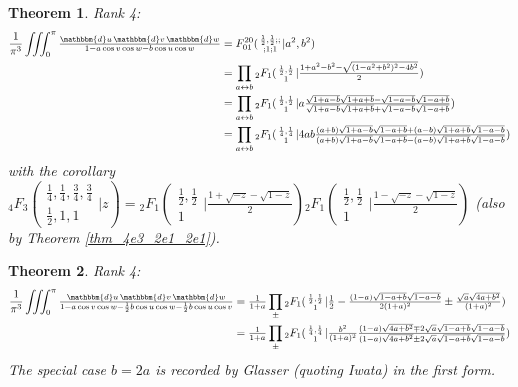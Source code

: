 \documentclass[12pt]{article}
\newcommand{\dd}[0] {\mathbbm{d}}
\numberwithin{equation}{section}
\newtheorem{theorem}{Theorem}[section]
\newcommand{\Head}[3] {{}_{#1}{#2}_{#3}}
\newcommand{\ArgS}[3] {( \begin{smallmatrix} #1 \\ #2 \end{smallmatrix} | {#3})}
\newcommand{\ArgKS}[1] {\ArgS{\frac12,\frac12}{1}{#1}}
\newcommand{\TwoHead}[3] {{#1}_{#3}^{#2}}
\newcommand{\HypFfourS}[6] {\TwoHead{F}{2 0}{0 1} \ArgS{{#1},{#2};;}{;{#3};{#4}}{{#5},{#6}}}
\newcommand{\FFs}[6] {{}_{#1}{#2}_{#3} ( \begin{smallmatrix} #4 \\ #5 \end{smallmatrix} | {#6}  )}
\begin{document}
\begin{theorem} Rank 4:
\begin{align*}
\frac{1}{\pi^3} \iiint_0^{\pi} \tfrac{\dd u \, \dd v \, \dd w} {1 - a \cos v \cos w - b \cos u \cos w} &= \HypFfourS{\frac12}{\frac12}{1}{1}{a^2}{b^2}\\
 &= \prod_{a \leftrightarrow b} \Head{2}{F}{1} \ArgKS{\tfrac{1 + a^2 - b^2-\sqrt{(1-a^2+b^2)^2-4b^2}}{2}}\\
&= \prod_{a \leftrightarrow b} \Head{2}{F}{1} \ArgKS{a\tfrac{\sqrt{1+a-b}\sqrt{1+a+b}-\sqrt{1-a-b}\sqrt{1-a+b}}{\sqrt{1+a-b}\sqrt{1+a+b}+\sqrt{1-a-b}\sqrt{1-a+b}}}\\
&= \prod_{a \leftrightarrow b} \Head{2}{F}{1}\ArgS{\frac14,\frac14}{1}{4a b \tfrac{(a+b)\sqrt{1+a-b}\sqrt{1-a+b} + (a-b) \sqrt{1+a+b}\sqrt{1-a-b}}{(a+b)\sqrt{1+a-b}\sqrt{1-a+b} - (a-b) \sqrt{1+a+b}\sqrt{1-a-b}}}
\end{align*}
with the corollary
$\FFs{4}{F}{3}{\frac14,\frac14,\frac34,\frac34}{\frac12,1,1}{z} = \Head{2}{F}{1}\ArgKS{\tfrac{1+\sqrt{-z} -\sqrt{1-z}}{2}} \Head{2}{F}{1}\ArgKS{\tfrac{1-\sqrt{-z} -\sqrt{1-z}}{2}}$ (also by Theorem \ref{thm_4e3_2e1_2e1}).
\end{theorem}

\begin{theorem} Rank 4:
\begin{align*}
\frac{1}{\pi^3} \iiint_0^{\pi} \tfrac{\dd u \, \dd v \, \dd w} {1 - a \cos v \cos w - \frac12 b \cos u \cos w - \frac12 b \cos u \cos v} &= \tfrac{1}{1+a} \prod_{\pm} \Head{2}{F}{1} \ArgKS{\tfrac{1}{2}-\tfrac{(1-a)\sqrt{1-a+b}\sqrt{1-a-b}}{2(1+a)^2} \pm \tfrac{\sqrt{a}\sqrt{4a+ b^2}}{(1+a)^2}}\\
&= \tfrac{1}{1+a} \prod_{\pm} \Head{2}{F}{1} \ArgS{\frac14,\frac14}{1}{ \tfrac{b^2}{(1+a)^2} \tfrac{(1-a)\sqrt{4a+b^2} \mp 2 \sqrt{a}\sqrt{1-a+b}\sqrt{1-a-b}}{(1-a)\sqrt{4a+b^2} \pm 2 \sqrt{a}\sqrt{1-a+b}\sqrt{1-a-b}} }
\end{align*}
The special case $b = 2a$ is recorded by Glasser (quoting Iwata) in the first form.
\end{theorem}
\end{document}
